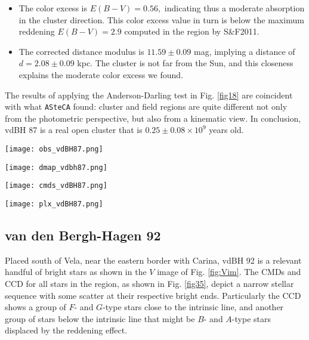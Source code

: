 \documentclass[draft]{aa}
\begin{document}
\begin{itemize}
\item [a)] The color excess is $E(B-V)=0.56,$ indicating thus a moderate
    absorption in the cluster direction. This color excess value in turn is
    below the maximum reddening $E(B-V)=2.9$ computed in the region by 
    S\&F2011.
\item [b)] The corrected distance modulus is $11.59\pm0.09$ mag, implying a
distance of $d=2.08\pm0.09$ kpc. The cluster is not far from the Sun, and
this closeness explains the moderate color excess we found.
\end{itemize}

The results of applying the Anderson-Darling test in Fig. \ref{fig18}
are coincident with what \texttt{ASteCA}  found: cluster and
field regions are quite different not only from the photometric perspective, but
also from a kinematic view.
In conclusion, vdBH 87 is a real open cluster that is $0.25\pm0.08\times10^9$
years old.

\begin{figure*}[ht]
    \centering
    \texttt{[image: obs\_vdBH87.png]}
    \caption{Idem Fig. \ref{fig:photom_vdBH85} for vdBH 87.}
    \label{fig15}
\end{figure*}

\begin{figure*}[ht]
    \centering
    \texttt{[image: dmap\_vdbh87.png]}
    \caption{Idem Fig. \ref{fig:struct_vdBH85} for vdBH 87.}
    \label{fig16}
\end{figure*}

\begin{figure*}[ht]
    \centering
    \texttt{[image: cmds\_vdBH87.png]}
    \caption{Idem Fig. \ref{fig:fundpars_vdBH85} for vdBH 87.}
    \label{fig17}
\end{figure*}
\begin{figure*}[ht]
    \centering
    \texttt{[image: plx\_vdBH87.png]}
    \caption{Idem Fig. \ref{fig:plx_bys_vdBH85} for vdBH 87.}
    \label{fig18}
\end{figure*}




\subsection{van den Bergh-Hagen 92}

Placed south of Vela, near the eastern border with Carina, vdBH
92 is a relevant handful of bright stars as shown in the $V$ image of Fig.
\ref{fig:Vim}. The CMDs and CCD for all stars in the region, as shown in Fig.
\ref{fig35}, depict a narrow stellar sequence with some scatter at their respective
bright ends. Particularly the CCD shows a
group of $F$- and $G$-type stars close to the intrinsic line, and another group of stars below the intrinsic
line that might be $B$- and $A$-type stars displaced by the reddening effect.\\
\end{document}

